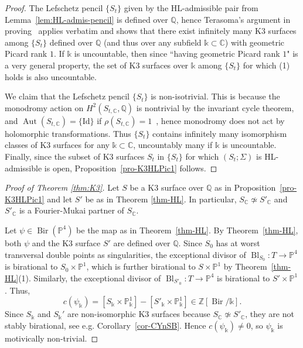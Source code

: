 \documentclass[a4paper,12pt]{amsart}
\def\C{\mathbb C}
\def\k{\mathbb k}
\def\P{\mathbb P}
\def\Q{\mathbb Q}
\def\Z{\mathbb Z}
\def\Bl{{\operatorname{Bl}}}
\def\Aut{{\operatorname{Aut}}}
\def\Bir{{\operatorname{Bir}}}
\def\Id{{\mathrm{Id}}}
\theoremstyle{plain}
\numberwithin{equation}{section}
\theoremstyle{definition}
\newcommand{\gS}{\Sigma}
\renewcommand{\(}{\left(}
\renewcommand{\)}{\right)}
\begin{document}
\begin{proof} 
The Lefschetz pencil $\{S_t\}$ 
given by the HL-admissible pair from 
Lemma~\ref{lem:HL-admis-pencil}
is defined over $\Q$,
hence Terasoma's argument in~\cite[Step 2 and Step 3 in \S3]{Terasoma}
proving~\cite[Theorem 1]{Terasoma}
applies verbatim 
and shows that there exist infinitely many 
K3 surfaces among $\{S_t\}$ defined over $\Q$
(and thus over any subfield $\k \subset \C$) with 
geometric Picard rank $1$. 
If $\k$ is uncountable,
then since ``having geometric Picard rank $1$" is a 
very general property,
the set of K3 surfaces over $\k$ 
among $\{S_t\}$ for which (1) holds
is also uncountable.


We claim that
the Lefschetz pencil
$\{S_t\}$ is non-isotrivial.
This is because the monodromy action on $H^2(S_{t,\C}, \Q)$
is nontrivial by the invariant cycle theorem,
and $\Aut(S_{t,\C}) = \{\Id\}$ if $\rho(S_{t,\C}) = 1$~\cite[Corollary 15.2.12]{HuybK3book}, 
hence
monodromy does not act by holomorphic transformations.
Thus $\{S_t\}$ contains infinitely many
isomorphism classes of K3 surfaces for any $\k \subset \C$,
uncountably many if $\k$ is uncountable.
Finally, since 
the subset of K3 surfaces $S_t$ 
in $\{S_t\}$
for which $(S_t; \gS)$ is HL-admissible  
is open, 
Proposition~\ref{pro-K3HLPic1} follows.
\end{proof}


\begin{proof}[Proof of Theorem \ref{thm:K3}]
Let $S$ be a K3 surface over $\Q$ as in Proposition~\ref{pro-K3HLPic1}
and let $S'$ be as in Theorem \ref{thm-HL}.
In particular, $S_\C \not\simeq S'_\C$ 
and $S'_\C$
is a Fourier-Mukai
partner of $S_\C$.

Let $\psi \in \Bir(\P^4)$ be the map as in Theorem~\ref{thm-HL}. 
By Theorem~\ref{thm-HL},
both $\psi$ and the K3 surface $S'$ are defined over $\Q$.
Since $S_0$ has at worst transversal double points as singularities,
the exceptional divisor of $\Bl_{S_0} : T \to \P^4$
is birational to $S_0 \times \P^1$,
which is further birational to $S \times \P^1$
by Theorem~\ref{thm-HL}(1).
Similarly, 
the exceptional divisor of $\Bl_{S'_0} : T \to \P^4$
is birational to $S' \times \P^1$.
Thus,
$$c(\psi_\k) = [S_\k \times \P^1_\k] - [S'_\k \times \P^1_\k] \in \Z[\Bir/\k].$$
Since $S_\k$ and $S_\k'$ are non-isomorphic
K3 surfaces 
because $S_\C \not\simeq S'_\C$, 
they are not stably birational, 
see e.g. Corollary~\ref{cor-CYnSB}.
Hence $c(\psi_\k) \ne 0$,
so $\psi_\k$ is motivically non-trivial.
\end{proof}
\end{document}
